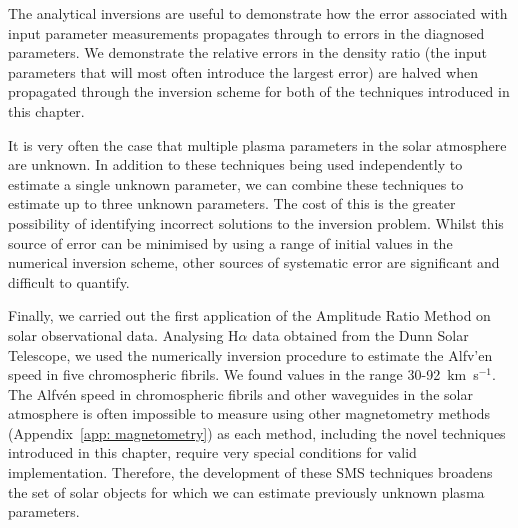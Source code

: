 \documentclass[12pt]{../style-files/ociamthesis}
\begin{document}
The analytical inversions are useful to demonstrate how the error associated with input parameter measurements propagates through to errors in the diagnosed parameters. We demonstrate the relative errors in the density ratio (the input parameters that will most often introduce the largest error) are halved when propagated through the inversion scheme for both of the techniques introduced in this chapter.

It is very often the case that multiple plasma parameters in the solar atmosphere are unknown. In addition to these techniques being used independently to estimate a single unknown parameter, we can combine these techniques to estimate up to three unknown parameters. The cost of this is the greater possibility of identifying incorrect solutions to the inversion problem. Whilst this source of error can be minimised by using a range of initial values in the numerical inversion scheme, other sources of systematic error are significant and difficult to quantify.

Finally, we carried out the first application of the Amplitude Ratio Method on solar observational data. Analysing H$\alpha$ data obtained from the Dunn Solar Telescope, we used the numerically inversion procedure to estimate the Alfv'{e}n speed in five chromospheric fibrils. We found values in the range 30-92~km~s$^{-1}$. The Alfv\'{e}n speed in chromospheric fibrils and other waveguides in the solar atmosphere is often impossible to measure using other magnetometry methods (Appendix~\ref{app: magnetometry}) as each method, including the novel techniques introduced in this chapter, require very special conditions for valid implementation. Therefore, the development of these SMS techniques broadens the set of solar objects for which we can estimate previously unknown plasma parameters.




\end{document}
